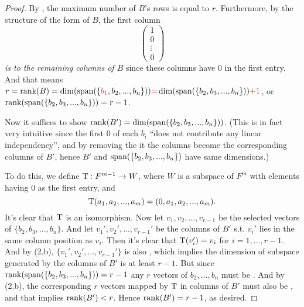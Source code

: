 \begin{proof}
By , the maximum number of \(B\)'s \LID{} rows is equal to \(r\).
Furthermore, by the structure of the form of \(B\), the first column
\[
    \begin{pmatrix} 1 \\ 0 \\ \vdots \\ 0 \end{pmatrix}
\]
\emph{is \LID{} to the remaining columns of \(B\)} since these columns have \(0\) in the first entry.
And that means \(r = \rank(B) = \dim(\spann(\{ \RED{b_1}, b_2, ..., b_n \})) \RED{=} \dim(\spann(\{ b_2, b_3, ..., b_n \})) \RED{+ 1}\), or \(\mathrm{rank}(\operatorname{span}(\{ b_2, b_3, ..., b_n \})) = r - 1\).

Now it suffices to show \(\mathrm{rank}(B') = \dim(\operatorname{span}(\{ b_2, b_3, ..., b_n \}))\).
(This is in fact very intuitive since the first \(0\) of each \(b_i\) ``does not contribute any linear independency'', and by removing the it the columns become the corresponding columns of \(B'\), hence \(B'\) and \(\operatorname{span}(\{ b_2, b_3, ..., b_n \})\) have same dimensions.)

To do this, we define \(\mathrm{T} : F^{m - 1} \to W\), where \(W\) is a subspace of \(F^m\) with elements having \(0\) as the first entry,
and
\[
    \mathrm{T}(a_1, a_2, ..., a_m) = (0, a_1, a_2, ..., a_m).
\]
It's clear that \(\mathrm{T}\) is an isomorphism.
Now let \(v_1, v_2, ..., v_{r - 1}\) be the selected \LID{} vectors of \(\{ b_2, b_3, ..., b_n \}\).
And let \(v_1', v_2', ..., v_{r - 1}'\) be the columns of \(B'\) s.t. \(v_i'\) lies in the same column position as \(v_i\).
Then it's clear that \(\mathrm{T}(v_i') = v_i\) for \(i = 1, ..., r - 1\).
And by (2.b), \(\{ v_1', v_2', ..., v_{r - 1}'\}\) is also \LID{}, which implies the dimension of subspace generated by the columns of \(B'\) is at least \(r - 1\).
But since \(\mathrm{rank}(\operatorname{span}(\{ b_2, b_3, ..., b_n \})) = r - 1\) any \(r\) vectors  of \(b_2, ..., b_n\) must be \LDP{}.
And by (2.b), the corresponding \(r\) vectors mapped by \(\mathrm{T}\) in columns of \(B'\) must also be \LDP{}, and that implies \(\mathrm{rank}(B') < r\).
Hence \(\mathrm{rank}(B') = r - 1\), as desired.
\end{proof}

